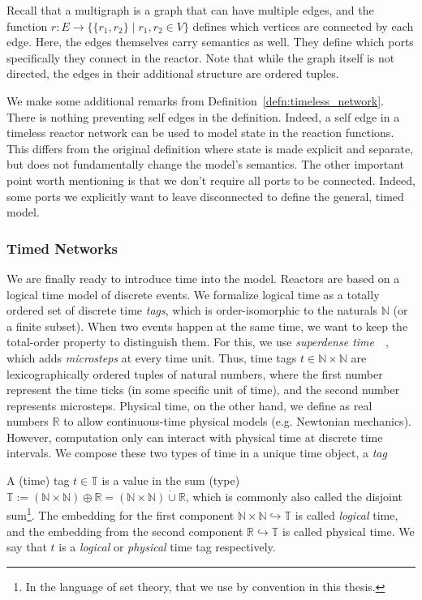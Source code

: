 Recall that a multigraph is a graph that can have multiple edges, and the function $r : E \rightarrow \{ \{r_1, r_2\} \mid r_1, r_2 \in V \}$ defines which vertices are connected by each edge.
Here, the edges themselves carry semantics as well. They define which ports specifically they connect in the reactor.
Note that while the graph itself is not directed, the edges in their additional structure are ordered tuples.

We make some additional remarks from Definition~\ref{defn:timeless_network}. 
There is nothing preventing self edges in the definition.
Indeed, a self edge in a timeless reactor network can be used to model state in the reaction functions.
This differs from the original definition where state is made explicit and separate, but does not fundamentally change the model's semantics.
The other important point worth mentioning is that we don't require all ports to be connected.
Indeed, some ports we explicitly want to leave disconnected to define the general, timed model. 

\subsubsection{Timed Networks}

We are finally ready to introduce time into the model.
Reactors are based on a logical time model of discrete events.
We formalize logical time as a totally ordered set of discrete time \emph{tags}, which is order-isomorphic to the naturals $\mathbb{N}$ (or a finite subset). 
When two events happen at the same time, we want to keep the total-order property to distinguish them.
For this, we use \emph{superdense time}~\cite{superdense,Ptolemaeus:14:SystemDesign}~, which adds \emph{microsteps} at every time unit.
Thus, time tags $t \in \mathbb{N} \times \mathbb{N}$ are lexicographically ordered tuples of natural numbers, where the first number represent the time ticks (in some specific unit of time), and the second number represents microsteps.
Physical time, on the other hand, we define as real numbers $\mathbb{R}$ to allow continuous-time physical models (e.g. Newtonian mechanics).
However, computation only can interact with physical time at discrete time intervals.
We compose these two types of time in a unique time object, a \emph{tag}

\begin{defn}[tag]
    \label{defn:tags}
   A (time) tag $t \in \mathbb{T}$ is a value in the sum (type) $\mathbb{T} := (\mathbb{N} \times \mathbb{N}) \oplus \mathbb{R} = (\mathbb{N} \times \mathbb{N}) \dot{\cup} \mathbb{R}$, which is commonly also called the disjoint sum\footnote{In the language of set theory, that we use by convention in this thesis.}.
   The embedding for the first component $\mathbb{N} \times \mathbb{N} \hookrightarrow \mathbb{T}$ is called \emph{logical} time, and the embedding from the second component $\mathbb{R} \hookrightarrow \mathbb{T}$ is called physical time.
   We say that $t$ is a \emph{logical} or \emph{physical} time tag respectively.
\end{defn}

